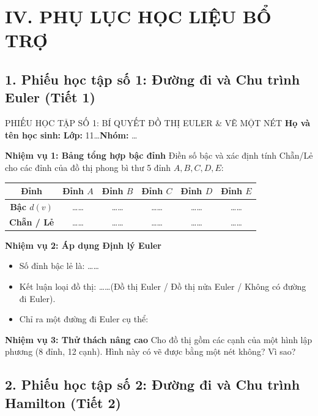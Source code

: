 \documentclass[12pt, a4paper]{article}
\begin{document}
\section*{IV. PHỤ LỤC HỌC LIỆU BỔ TRỢ}

\subsection*{1. Phiếu học tập số 1: Đường đi và Chu trình Euler (Tiết 1)}

\begin{pedabox}{PHIẾU HỌC TẬP SỐ 1: BÍ QUYẾT ĐỒ THỊ EULER \& VẼ MỘT NÉT}
    \textbf{Họ và tên học sinh:} \dotfill \textbf{Lớp:} 11\dots \textbf{Nhóm:} \dots
    
    \textbf{Nhiệm vụ 1: Bảng tổng hợp bậc đỉnh}
    Điền số bậc và xác định tính Chẵn/Lẻ cho các đỉnh của đồ thị phong bì thư 5 đỉnh $A, B, C, D, E$:
    \begin{center}
    \begin{tabular}{|c|c|c|c|c|c|}
    \hline
    \textbf{Đỉnh} & Đỉnh $A$ & Đỉnh $B$ & Đỉnh $C$ & Đỉnh $D$ & Đỉnh $E$ \\ \hline
    \textbf{Bậc $d(v)$} & \dots\dots & \dots\dots & \dots\dots & \dots\dots & \dots\dots \\ \hline
    \textbf{Chẵn / Lẻ} & \dots\dots & \dots\dots & \dots\dots & \dots\dots & \dots\dots \\ \hline
    \end{tabular}
    \end{center}
    
    \textbf{Nhiệm vụ 2: Áp dụng Định lý Euler}
    \begin{itemize}[leftmargin=0.6cm]
        \item Số đỉnh bậc lẻ là: \dots\dots
        \item Kết luận loại đồ thị: \dots\dots (Đồ thị Euler / Đồ thị nửa Euler / Không có đường đi Euler).
        \item Chỉ ra một đường đi Euler cụ thể: \dotfill
    \end{itemize}
    
    \textbf{Nhiệm vụ 3: Thử thách nâng cao}
    Cho đồ thị gồm các cạnh của một hình lập phương (8 đỉnh, 12 cạnh). Hình này có vẽ được bằng một nét không? Vì sao?
    \dotfill
\end{pedabox}

\subsection*{2. Phiếu học tập số 2: Đường đi và Chu trình Hamilton (Tiết 2)}
\end{document}

